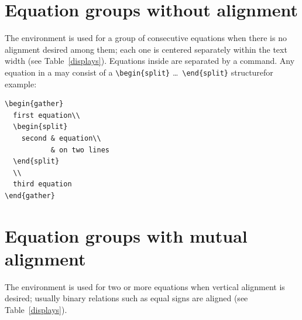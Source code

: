 \documentclass[leqno,titlepage,openany]{amsldoc}[1999/12/13]
\makeatletter
\let\oldcs\cs
\def\cs#1{\texorpdfstring{\oldcs{#1}}{\@backslashchar\@backslashchar#1}}
\let\cn\cs
\makeatother
\begin{document}
\section{Equation groups without alignment}

The  environment is used for a group of consecutive
equations when there is no alignment desired among them; each one is
centered separately within the text width (see Table~\ref{displays}).
Equations inside  are separated by a \cn{\\} command.
Any equation in a  may consist of a \verb'\begin{split}'
  \dots\ \verb'\end{split}' structure\mdash for example:
\begin{verbatim}
\begin{gather}
  first equation\\
  \begin{split}
    second & equation\\
           & on two lines
  \end{split}
  \\
  third equation
\end{gather}
\end{verbatim}


\section{Equation groups with mutual alignment}

The  environment is used for two or more equations when
vertical alignment is desired; usually binary relations such as equal
signs are aligned (see Table~\ref{displays}).
\end{document}
